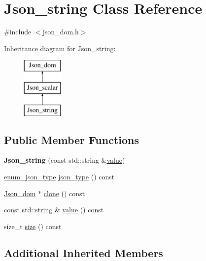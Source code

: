 \hypertarget{classJson__string}{}\section{Json\+\_\+string Class Reference}
\label{classJson__string}


{\ttfamily \#include $<$json\+\_\+dom.\+h$>$}

Inheritance diagram for Json\+\_\+string\+:\begin{figure}[H]
\begin{center}
\leavevmode
\includegraphics[height=3.000000cm]{classJson__string}
\end{center}
\end{figure}
\subsection*{Public Member Functions}
\begin{DoxyCompactItemize}
\item 
\mbox{\label{classJson__string_a3093c484c4c7e10eb938cbcd240295bc}} 
{\bfseries Json\+\_\+string} (const std\+::string \&\mbox{\hyperlink{classJson__string_a81118776d98491e24ea6606c1228b460}{value}})
\item 
\mbox{\hyperlink{classJson__dom_af37eed7dfe1da1d6507d3ab85320eb03}{enum\+\_\+json\+\_\+type}} \mbox{\hyperlink{classJson__string_a017004aa85b748d8cb225bd9cd159722}{json\+\_\+type}} () const
\item 
\mbox{\hyperlink{classJson__dom}{Json\+\_\+dom}} $\ast$ \mbox{\hyperlink{classJson__string_a57fb9e6a51883be719c67d3c6ceb6af9}{clone}} () const
\item 
const std\+::string \& \mbox{\hyperlink{classJson__string_a81118776d98491e24ea6606c1228b460}{value}} () const
\item 
size\+\_\+t \mbox{\hyperlink{classJson__string_af7a86637f23c483fd591d26387c205a2}{size}} () const
\end{DoxyCompactItemize}
\subsection*{Additional Inherited Members}


